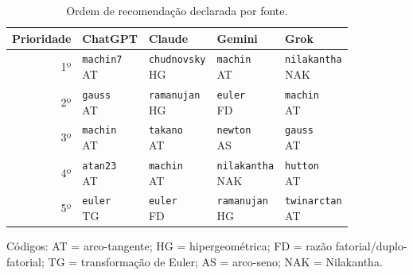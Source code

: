 \begin{table}[htbp]
\centering
\caption{Ordem de recomendação declarada por fonte.}
\label{tab:recommendation-order}
\footnotesize
\setlength{\tabcolsep}{3pt}
\begin{tabularx}{\linewidth}{r *{4}{>{\centering\arraybackslash}X}}
\toprule
Prioridade & ChatGPT & Claude & Gemini & Grok\\
\midrule
1º & \shortstack{\texttt{machin7}\\[-1pt]\scriptsize AT} & \shortstack{\texttt{chudnovsky}\\[-1pt]\scriptsize HG} & \shortstack{\texttt{machin}\\[-1pt]\scriptsize AT} & \shortstack{\texttt{nilakantha}\\[-1pt]\scriptsize NAK}\\
2º & \shortstack{\texttt{gauss}\\[-1pt]\scriptsize AT} & \shortstack{\texttt{ramanujan}\\[-1pt]\scriptsize HG} & \shortstack{\texttt{euler}\\[-1pt]\scriptsize FD} & \shortstack{\texttt{machin}\\[-1pt]\scriptsize AT}\\
3º & \shortstack{\texttt{machin}\\[-1pt]\scriptsize AT} & \shortstack{\texttt{takano}\\[-1pt]\scriptsize AT} & \shortstack{\texttt{newton}\\[-1pt]\scriptsize AS} & \shortstack{\texttt{gauss}\\[-1pt]\scriptsize AT}\\
4º & \shortstack{\texttt{atan23}\\[-1pt]\scriptsize AT} & \shortstack{\texttt{machin}\\[-1pt]\scriptsize AT} & \shortstack{\texttt{nilakantha}\\[-1pt]\scriptsize NAK} & \shortstack{\texttt{hutton}\\[-1pt]\scriptsize AT}\\
5º & \shortstack{\texttt{euler}\\[-1pt]\scriptsize TG} & \shortstack{\texttt{euler}\\[-1pt]\scriptsize FD} & \shortstack{\texttt{ramanujan}\\[-1pt]\scriptsize HG} & \shortstack{\texttt{twinarctan}\\[-1pt]\scriptsize AT}\\
\bottomrule
\end{tabularx}
\end{table}
\par\smallskip\footnotesize Códigos: AT = arco-tangente; HG = hipergeométrica; FD = razão fatorial/duplo-fatorial; TG = transformação de Euler; AS = arco-seno; NAK = Nilakantha.\normalsize
